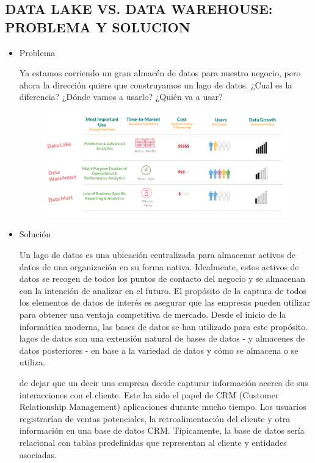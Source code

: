 \documentclass[preprint,12pt]{elsarticle}
\begin{document}
\subsection{DATA LAKE VS. DATA WAREHOUSE: PROBLEMA Y SOLUCION}	

\begin{itemize}

\item Problema

Ya estamos corriendo un gran almacén de datos para nuestro negocio, pero ahora la dirección quiere que construyamos un lago de datos. ¿Cual es la diferencia? ¿Dónde vamos a usarlo? ¿Quién va a usar?

\begin{figure}[htb]
				\begin{center}
					\includegraphics[width=15cm]{./IMAGENES/fiorella5}
				\end{center}
			\end{figure}

\item Solución

Un lago de datos es una ubicación centralizada para almacenar activos de datos de una organización en su forma nativa. Idealmente, estos activos de datos se recogen de todos los puntos de contacto del negocio y se almacenan con la intención de analizar en el futuro. El propósito de la captura de todos los elementos de datos de interés es asegurar que las empresas pueden utilizar para obtener una ventaja competitiva de mercado. Desde el inicio de la informática moderna, las bases de datos se han utilizado para este propósito. lagos de datos son una extensión natural de bases de datos - y almacenes de datos posteriores - en base a la variedad de datos y cómo se almacena o se utiliza.

de dejar que un decir una empresa decide capturar información acerca de sus interacciones con el cliente. Este ha sido el papel de CRM (Customer Relationship Management) aplicaciones durante mucho tiempo. Los usuarios registrarían de ventas potenciales, la retroalimentación del cliente y otra información en una base de datos CRM. Típicamente, la base de datos sería relacional con tablas predefinidas que representan al cliente y entidades asociadas.


\end{itemize}
\end{document}
